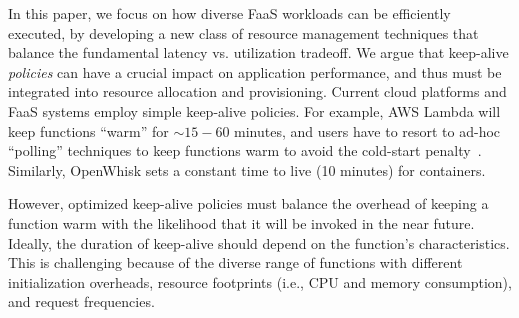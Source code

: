 \begin{comment}
In this paper, we explore this tradeoff, and argue for and develop principled keep-alive techniques. 
%
Current cloud platforms and FaaS systems employ simple keep-alive policies. 
%
For example, AWS Lambda will keep functions ``warm'' for $\sim 15-60$ minutes, and users have to resort to wasteful ``polling'' techniques to keep functions warm to avoid the cold-start penalty~\cite{lambda-warm, lambda-limits, lambda-warm-hour}. 
% 
An optimized keep-alive policy must balance the overhead of keeping a function warm with the likelihood that the function will be called again in the near future, and the duration of keep-alive should depend on the function's characteristics. 
%
Designing keep-alive policies is challenging because of the diverse range of functions with different initialization overheads, resource footprints (i.e., CPU and memory consumption),  and request frequencies. 
%
\end{comment}


%
In this paper, we focus on how diverse FaaS workloads can be efficiently executed, by developing a new class of resource management techniques that balance the fundamental latency vs. utilization tradeoff.
We argue that keep-alive \emph{policies} can have a crucial impact on application performance, and thus must be integrated into resource allocation and provisioning. %
Current cloud platforms and FaaS systems employ simple keep-alive policies. 
For example, AWS Lambda will keep functions ``warm'' for $\sim 15-60$ minutes, and users have to resort to ad-hoc ``polling'' techniques to keep functions warm to avoid the cold-start penalty~\cite{lambda-warm, lambda-limits, lambda-warm-hour}.
Similarly, OpenWhisk sets a constant time to live (10 minutes) for containers.


However, optimized keep-alive policies must balance the overhead of keeping a function warm with the likelihood that it will be invoked in the near future. 
Ideally, the duration of keep-alive should depend on the function's characteristics. 
This is challenging because of the diverse range of functions with different initialization overheads, resource footprints (i.e., CPU and memory consumption),  and request frequencies. 


